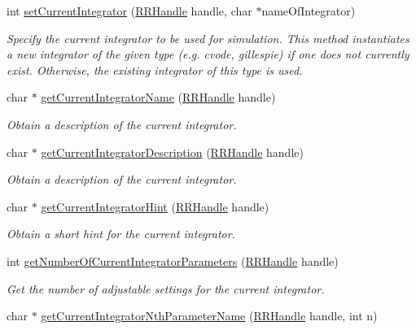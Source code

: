 \begin{DoxyCompactItemize}
int \hyperlink{group__simopts_ga7d4664a6a66a2a9b224db95b751127fe}{set\+Current\+Integrator} (\hyperlink{rrc__types_8h_a1d68f0592372208fa5a5f2799ea4b3ae}{R\+R\+Handle} handle, char $\ast$name\+Of\+Integrator)
\begin{DoxyCompactList}\small\item\em Specify the current integrator to be used for simulation.  This method instantiates a new integrator of the given type (e.\+g. cvode, gillespie) if one does not currently exist. Otherwise, the existing integrator of this type is used. \end{DoxyCompactList}\item 
char $\ast$ \hyperlink{group__simopts_gac5b7c83a8b539302b657f4ad3522fc9c}{get\+Current\+Integrator\+Name} (\hyperlink{rrc__types_8h_a1d68f0592372208fa5a5f2799ea4b3ae}{R\+R\+Handle} handle)
\begin{DoxyCompactList}\small\item\em Obtain a description of the current integrator. \end{DoxyCompactList}\item 
char $\ast$ \hyperlink{group__simopts_ga4a917a0539977b7206d1bfbddcc98347}{get\+Current\+Integrator\+Description} (\hyperlink{rrc__types_8h_a1d68f0592372208fa5a5f2799ea4b3ae}{R\+R\+Handle} handle)
\begin{DoxyCompactList}\small\item\em Obtain a description of the current integrator. \end{DoxyCompactList}\item 
char $\ast$ \hyperlink{group__simopts_gadc3f18f7a683daa8848968ba54436f96}{get\+Current\+Integrator\+Hint} (\hyperlink{rrc__types_8h_a1d68f0592372208fa5a5f2799ea4b3ae}{R\+R\+Handle} handle)
\begin{DoxyCompactList}\small\item\em Obtain a short hint for the current integrator. \end{DoxyCompactList}\item 
int \hyperlink{group__simopts_ga7885d06904fc2cdceaa7e71448cde468}{get\+Number\+Of\+Current\+Integrator\+Parameters} (\hyperlink{rrc__types_8h_a1d68f0592372208fa5a5f2799ea4b3ae}{R\+R\+Handle} handle)
\begin{DoxyCompactList}\small\item\em Get the number of adjustable settings for the current integrator. \end{DoxyCompactList}\item 
char $\ast$ \hyperlink{group__simopts_ga81f0ab837b82e6bdc8740237c7a2ef11}{get\+Current\+Integrator\+Nth\+Parameter\+Name} (\hyperlink{rrc__types_8h_a1d68f0592372208fa5a5f2799ea4b3ae}{R\+R\+Handle} handle, int n)

\end{DoxyCompactItemize}
